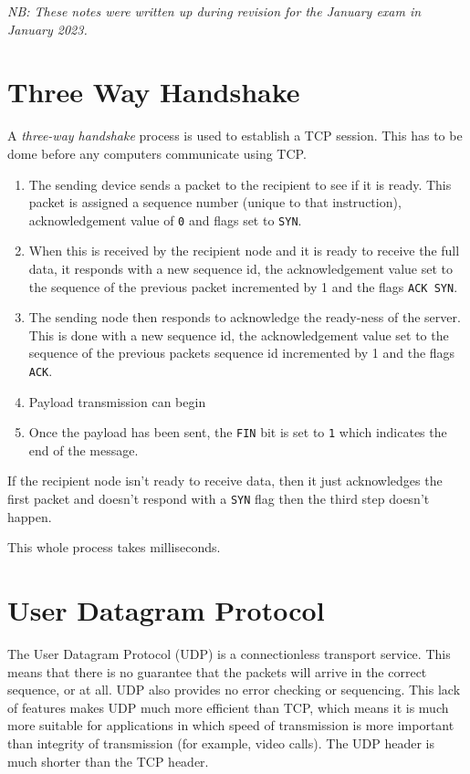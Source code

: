 \emph{NB: These notes were written up during revision for the January exam in January 2023.}

\section*{Three Way Handshake}
A \emph{three-way handshake} process is used to establish a TCP session. This has to be dome before any computers communicate using TCP.

\begin{enumerate}
    \item The sending device sends a packet to the recipient to see if it is ready. This packet is assigned a sequence number (unique to that instruction), acknowledgement value of \verb|0| and flags set to \verb|SYN|.
    \item When this is received by the recipient node and it is ready to receive the full data, it responds with a new sequence id, the acknowledgement value set to the sequence of the previous packet incremented by 1 and the flags \verb|ACK SYN|.
    \item The sending node then responds to acknowledge the ready-ness of the server. This is done with a new sequence id, the acknowledgement value set to the sequence of the previous packets sequence id incremented by 1 and the flags \verb|ACK|. 
    \item Payload transmission can begin
    \item Once the payload has been sent, the \verb|FIN| bit is set to \verb|1| which indicates the end of the message. 
\end{enumerate}
If the recipient node isn't ready to receive data, then it just acknowledges the first packet and doesn't respond with a \verb|SYN| flag then the third step doesn't happen.

This whole process takes milliseconds.

\section*{User Datagram Protocol}
The User Datagram Protocol (UDP) is a connectionless transport service. This means that there is no guarantee that the packets will arrive in the correct sequence, or at all. UDP also provides no error checking or sequencing. This lack of features makes UDP much more efficient than TCP, which means it is much more suitable for applications in which speed of transmission is more important than integrity of transmission (for example, video calls). The UDP header is much shorter than the TCP header. 